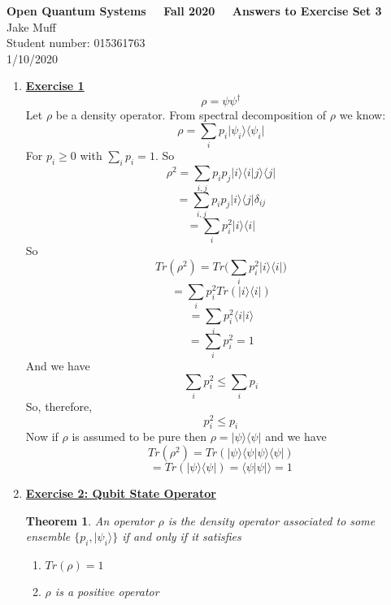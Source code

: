 \documentclass[12pt]{article}
\newtheorem{theorem}{Theorem}
\newcommand{\ket}[1]{\vert{#1}\rangle}
\newcommand{\bra}[1]{\langle{#1}\vert}
\begin{document}
\normalsize

\baselineskip 14pt

\begin{center}
{\Large {\bf Open Quantum Systems \ \ Fall 2020 \ \  Answers to Exercise Set 3}}\\
{\large { Jake Muff}}\\
{Student number: 015361763}\\
{1/10/2020}
\end{center}



\begin{enumerate}

\item \textbf{\underline{Exercise 1}}
$$ \rho = \psi \psi^\dagger $$
Let $\rho$ be a density operator. From spectral decomposition of $\rho$ we know:
$$ \rho = \sum_i p_i \ket{\psi_i} \bra{\psi_i} $$
For $p_i \geq 0 $ with $\sum_i p_i =1$. So 
$$ \rho^2 = \sum_{i,j} p_i p_j \ket{i} \langle i | j \rangle \bra{j} $$
$$ = \sum_{i,j} p_i p_j \ket{i} \bra{j} \delta_{ij} $$
$$ = \sum_i p_i^2 \ket{i} \bra{i} $$
So 
$$ Tr(\rho^2) = Tr\Big( \sum_i p_i^2 \ket{i} \bra{i}\Big) $$
$$ = \sum_i p_i^2 Tr(\ket{i} \bra{i}) $$
$$ = \sum_i p_i^2 \langle i | i \rangle $$ 
$$ = \sum_i p_i^2 = 1$$
And we have 
$$ \sum_i p_i^2 \leq \sum_i p_i  $$
So, therefore, 
$$ p_i^2 \leq p_i $$
Now if $\rho$ is assumed to be pure then $\rho = \ket{\psi} \bra{\psi}$ and we have 
$$ Tr(\rho^2) = Tr(\ket{\psi} \langle \psi | \psi \rangle \bra{\psi}) $$
$$ = Tr(\ket{\psi} \bra{\psi}) = \langle \psi | \psi |\rangle = 1$$ 

\item \textbf{\underline{Exercise 2: Qubit State Operator}}
\begin{theorem} \label{2.5}
    An operator $\rho$ is the density operator associated to some ensemble $\{p_i, \ket{\psi_i}\}$ if and only if it satisfies
    \begin{enumerate}
        \item $Tr(\rho) = 1$
        \item $\rho$ is a positive operator 
    \end{enumerate}
\end{theorem}




\end{enumerate}
\end{document}
